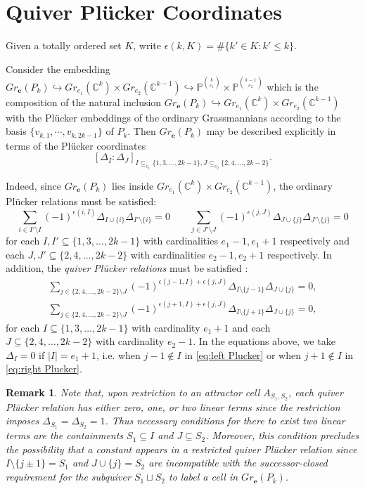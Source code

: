 \documentclass{amsart}
\newtheorem{remark}[theorem]{Remark}
\numberwithin{equation}{section}
\newcommand{\CC}{\mathbb{C}}
\newcommand{\PP}{\mathbb{P}}
\newcommand{\bfe}{\mathbf{e}}
\newcommand{\into}{\hookrightarrow}
\begin{document}
  \section{Quiver Pl\"ucker Coordinates}
  Given a totally ordered set $K$, write $\epsilon(k,K)=\#\{k'\in K: k'\le k\}$.

  Consider the embedding $Gr_\bfe(P_k)\into Gr_{e_1}(\CC^k)\times Gr_{e_2}(\CC^{k-1})\into \PP^{k \choose e_1}\times \PP^{k-1 \choose e_2}$ which is the composition of the natural inclusion $Gr_\bfe(P_k)\into Gr_{e_1}(\CC^k)\times Gr_{e_2}(\CC^{k-1})$ with the Pl\"ucker embeddings of the ordinary Grassmannians according to the basis $\{v_{k,1},\cdots,v_{k,2k-1}\}$ of $P_k$.
  Then $Gr_\bfe(P_k)$ may be described explicitly in terms of the Pl\"ucker coordinates 
  \[[\Delta_I:\Delta_J]_{I\subseteq_{e_1} \{1,3,\ldots,2k-1\}, J\subseteq_{e_2} \{2,4,\ldots,2k-2\}}.\]
  
  Indeed, since $Gr_\bfe(P_k)$ lies inside $Gr_{e_1}(\CC^k)\times Gr_{e_2}(\CC^{k-1})$, the ordinary Pl\"ucker relations must be satisfied:
  \[\sum_{i\in I'\setminus I} (-1)^{\epsilon(i,I)} \Delta_{I\cup\{i\}} \Delta_{I'\setminus\{i\}}=0
    \qquad
    \sum_{j\in J'\setminus J} (-1)^{\epsilon(j,J)} \Delta_{J\cup\{j\}} \Delta_{J'\setminus\{j\}}=0\]
  for each $I,I'\subseteq\{1,3,\ldots,2k-1\}$ with cardinalities $e_1-1,e_1+1$ respectively and each $J,J'\subseteq\{2,4,\ldots, 2k-2\}$ with cardinalities $e_2-1,e_2+1$ respectively.
  In addition, the \emph{quiver Pl\"ucker relations} must be satisfied \cite{lorscheid-weist}:
  \begin{align}
    \label{eq:left Plucker} \sum_{j\in \{2,4,\ldots,2k-2\}\setminus J} (-1)^{\epsilon(j-1,I)+\epsilon(j,J)} \Delta_{I\setminus\{j-1\}} \Delta_{J\cup\{j\}}=0,\\
    \label{eq:right Plucker} \sum_{j\in \{2,4,\ldots,2k-2\}\setminus J} (-1)^{\epsilon(j+1,I)+\epsilon(j,J)} \Delta_{I\setminus\{j+1\}} \Delta_{J\cup\{j\}}=0,
  \end{align}
  for each $I\subseteq\{1,3,\ldots,2k-1\}$ with cardinality $e_1+1$ and each $J\subseteq\{2,4,\ldots, 2k-2\}$ with cardinality $e_2-1$.
  In the equations above, we take $\Delta_I=0$ if $|I|=e_1+1$, i.e. when $j-1\notin I$ in \eqref{eq:left Plucker} or when $j+1\notin I$ in \eqref{eq:right Plucker}.
  \begin{remark}
    \label{rm:linear terms}
    Note that, upon restriction to an attractor cell $A_{S_1,S_2}$, each quiver Pl\"ucker relation has either zero, one, or two linear terms since the restriction imposes $\Delta_{S_1}=\Delta_{S_2}=1$.
    Thus necessary conditions for there to exist two linear terms are the containments $S_1\subseteq I$ and $J\subseteq S_2$.
    Moreover, this condition precludes the possibility that a constant appears in a restricted quiver Pl\"ucker relation since $I\setminus\{j\pm1\}=S_1$ and $J\cup\{j\}=S_2$ are incompatible with the successor-closed requirement for the subquiver $S_1\sqcup S_2$ to label a cell in $Gr_\bfe(P_k)$.
  \end{remark}
\end{document}
